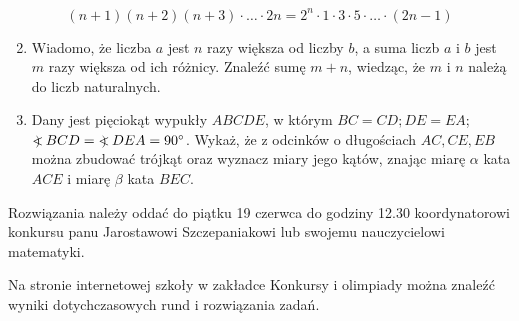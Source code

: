 \documentclass[10pt]{article}
\newcommand\Varangle{\mathop{{<\!\!\!\!\!\text{\small)}}\:}\nolimits}
\begin{document}
\[
(n+1)(n+2)(n+3) \cdot \ldots \cdot 2 n=2^{n} \cdot 1 \cdot 3 \cdot 5 \cdot \ldots \cdot(2 n-1)
\]

\begin{enumerate}
  \setcounter{enumi}{1}
  \item Wiadomo, że liczba \(a\) jest \(n\) razy większa od liczby \(b\), a suma liczb \(a\) i \(b\) jest \(m\) razy większa od ich różnicy. Znaleźć sumę \(m+n\), wiedząc, że \(m\) i \(n\) należą do liczb naturalnych.
  \item Dany jest pięciokąt wypukły \(A B C D E\), w którym \(B C=C D ; D E=E A\); \(\Varangle B C D=\Varangle D E A=90^{\circ}\). Wykaż, że z odcinków o długościach \(A C, C E, E B\) można zbudować trójkąt oraz wyznacz miary jego kątów, znając miarę \(\alpha\) kata \(A C E\) i miarę \(\beta\) kata \(B E C\).
\end{enumerate}

Rozwiązania należy oddać do piątku 19 czerwca do godziny 12.30 koordynatorowi konkursu panu Jarostawowi Szczepaniakowi lub swojemu nauczycielowi matematyki.

Na stronie internetowej szkoły w zakładce Konkursy i olimpiady można znaleźć wyniki dotychczasowych rund i rozwiązania zadań.
\end{document}
